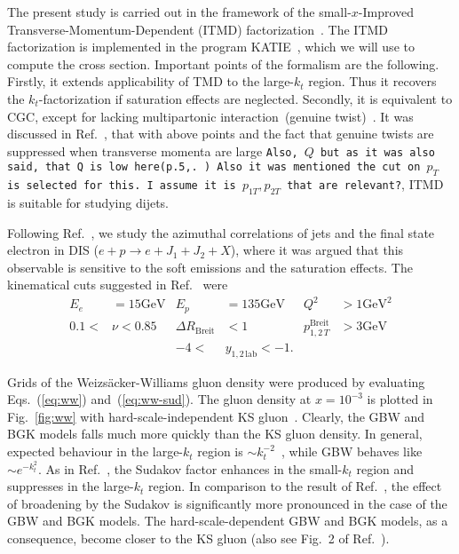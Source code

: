 \documentclass[a4,12pt]{article}
\newcommand{\GeV}[0]{\mathrm{GeV}}
\newcommand{\comment}[1]{\texttt{\color{red}#1}}
\begin{document}
  
The present study is carried out in the framework of the small-$x$-Improved Transverse-Momentum-Dependent (ITMD) factorization~\cite{Kotko:2015ura,vanHameren:2016ftb}.
The ITMD factorization is implemented in the program KATIE~\cite{vanHameren:2016kkz}, which we will use to compute the cross section. Important points of the formalism are the following. Firstly, it extends applicability of TMD to the large-$k_t$ region. Thus it recovers the $k_t$-factorization if saturation effects are neglected. Secondly, it is equivalent to CGC, except for lacking multipartonic interaction~(genuine twist)~\cite{Altinoluk:2019fui}. It was discussed in Ref.~\cite{vanHameren:2021sqc}, that with above points and the fact that genuine twists are suppressed when transverse momenta are large \comment{Also, $Q$ but as it was also said, that Q is low here(p.5,\cite{vanHameren:2021sqc}. )  Also it was mentioned the cut on $p_T$ is selected for this. I assume it is $p_{1T}, p_{2T}$ that are relevant?}, ITMD is suitable for studying dijets.

Following Ref.~\cite{vanHameren:2021sqc}, we study the azimuthal correlations of jets and the final state electron in DIS ($e+p\rightarrow e+J_1+J_2+X$), where it was argued that this observable is sensitive to the soft emissions and the saturation effects. 
The kinematical cuts suggested in Ref.~\cite{vanHameren:2021sqc} were
\begin{align*}
	E_e&=15\GeV& E_p&=135\GeV& Q^2&>1\GeV^2\\
	0.1<&\nu<0.85&\Delta R_{\mathrm{Breit}}&<1&p^{\mathrm{Breit}}_{1,2\,T}&>3\GeV\\
	&&-4<&y_{1,2\,\mathrm{lab}}<-1.&&
\end{align*}

Grids of the Weizs\"acker-Williams gluon density were produced by evaluating Eqs.~(\ref{eq:ww}) and~(\ref{eq:ww-sud}).
The gluon density at $x=10^{-3}$ is plotted in Fig.~\ref{fig:ww} with hard-scale-independent KS gluon~\cite{vanHameren:2021sqc}. Clearly, the GBW and BGK models falls much more quickly than the KS gluon density. In general, expected behaviour in the large-$k_t$ region is $\sim k_t^{-2}$~\cite{Dominguez:2010xd,Dominguez:2011wm}, while GBW behaves like $\sim e^{-k_t^2}$.
As in Ref.~\cite{vanHameren:2021sqc}, the Sudakov factor enhances in the small-$k_t$ region and suppresses in the large-$k_t$ region. In comparison to the result of Ref.~\cite{vanHameren:2021sqc}, the effect of broadening by the Sudakov is significantly more pronounced in the case of the GBW and BGK models. The hard-scale-dependent GBW and BGK models, as a consequence, become closer to the KS gluon (also see Fig.~2 of Ref.~\cite{vanHameren:2021sqc}).  
\end{document}
